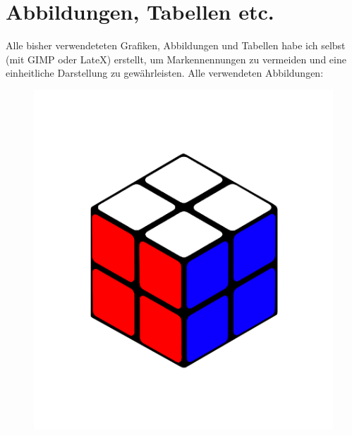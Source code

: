 \documentclass[12pt,a4paper, usenames, dvipsnames]{scrartcl}
\begin{document}
\section{Abbildungen, Tabellen etc.}

Alle bisher verwendeteten Grafiken, Abbildungen und Tabellen habe ich selbst (mit GIMP oder LateX) erstellt, um Markennennungen zu vermeiden und eine einheitliche Darstellung zu gewährleisten.
Alle verwendeten Abbildungen: \\
\begin{figure}[h]
\includegraphics[scale=0.04]{2x2solved.png}

\end{figure}
\end{document}
